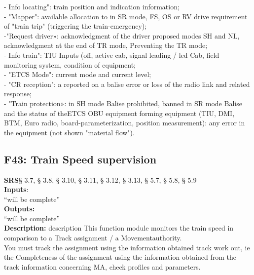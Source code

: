 \documentclass{template/openetcs_report}
\begin{document}
- Info locating": train position and indication information; \\

- "Mapper": available allocation to in SR mode, FS, OS or RV 
drive requirement of "train trip" (triggering the train-emergency); \\

-"Request driver»: acknowledgment of the driver 
proposed modes SH and NL, acknowledgment at the end of TR mode, 
Preventing the TR mode; \\

- Info train": TIU Inputs (off, active cab, signal leading / led 
Cab, field monitoring system, condition of equipment; \\

- "ETCS Mode": current mode and current level; \\

- "CR reception": a reported on a balise error or loss of the radio link 
and related response; \\

- "Train protection»: in SH mode Balise prohibited, banned in SR mode Balise 
and the status of theETCS OBU equipment forming equipment (TIU, DMI, 
BTM, Euro radio, board-parameterization, position measurement): any error in the equipment 
(not shown "material flow").\\

\subsection {F43: Train Speed supervision}
 \textbf{SRS}§ 3.7, § 3.8, § 3.10, § 3.11, § 3.12, § 3.13, § 5.7, § 5.8, § 5.9 \\
 
 \textbf{Inputs}:\\
``will be complete''\\
 
 \textbf{Outputs:}\\
 ``will be complete''\\
 
 \textbf{Description:} 
description 
This function module monitors the train speed in comparison to a 
Track assignment / a Movementauthority. \\

You must track the assignment using the information obtained track work out, ie the 
Completeness of the assignment using the information obtained from the track information
concerning MA, check profiles and parameters. \\
\end{document}
